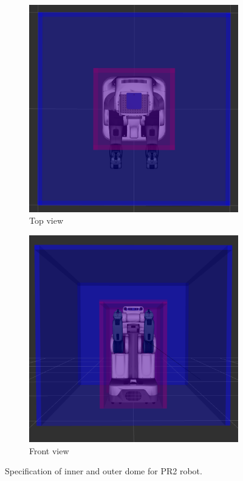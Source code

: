 \documentclass[a4paper]{report}
\begin{document}
\begin{figure}[H]
    \centering
    \begin{subfigure}{0.48\textwidth}
         \includegraphics[width=\textwidth]{domes_top}
        \caption{Top view}
        \label{fig:domes_top}
    \end{subfigure} 
    \begin{subfigure}{0.48\textwidth}
         \includegraphics[width=\textwidth]{domes_front}
        \caption{Front view}
        \label{fig:domes_front}
    \end{subfigure}
    \caption{
    Specification of inner and outer dome for PR2 robot.
    }
\label{fig:domes}
\end{figure}
\end{document}
